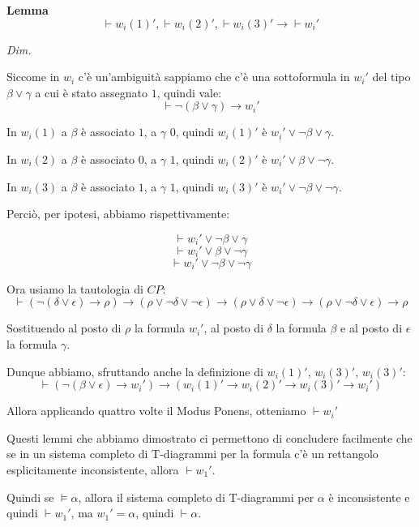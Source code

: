 \documentclass[a4paper, 12pt]{article}
\begin{document}
\begin{flushleft}
\textbf{Lemma}
$$\vdash w_i(1)', \vdash w_i(2)', \vdash w_i(3)' \rightarrow \vdash w_i'$$

\textit{Dim.}

Siccome in $w_i$ c'è un'ambiguità sappiamo che c'è una sottoformula in $w_i'$
del tipo $\beta \lor \gamma$ a cui è stato assegnato $1$, quindi vale:
$$\vdash \neg (\beta \lor \gamma) \rightarrow w_i'$$

In $w_i(1)$ a $\beta$ è associato $1$, a $\gamma$ $0$, quindi $w_i(1)'$ è $w_i' \lor \neg \beta \lor \gamma$.

In $w_i(2)$ a $\beta$ è associato $0$, a $\gamma$ $1$, quindi $w_i(2)'$ è $w_i' \lor \beta \lor \neg \gamma$.

In $w_i(3)$ a $\beta$ è associato $1$, a $\gamma$ $1$, quindi $w_i(3)'$ è $w_i' \lor \neg \beta \lor \neg \gamma$.

Perciò, per ipotesi, abbiamo rispettivamente:

$$\vdash w_i' \lor \neg \beta \lor \gamma$$
$$\vdash w_i' \lor \beta \lor \neg \gamma$$
$$\vdash w_i' \lor \neg \beta \lor \neg \gamma$$

Ora usiamo la tautologia di $CP$:
$$\vdash (\neg (\delta \lor \epsilon) \rightarrow \rho) \rightarrow
         (\rho \lor \neg \delta \lor \neg \epsilon) \rightarrow (\rho \lor \delta \lor \neg \epsilon)
           \rightarrow (\rho \lor \neg \delta \lor \epsilon) \rightarrow \rho$$

Sostituendo al posto di $\rho$ la formula $w_i'$, al posto di $\delta$ la formula $\beta$
e al posto di $\epsilon$ la formula $\gamma$.

Dunque abbiamo, sfruttando anche la definizione di $w_i(1)'$, $w_i(3)'$, $w_i(3)'$:
$$\vdash (\neg (\beta \lor \epsilon) \rightarrow w_i') \rightarrow
         (w_i(1)' \rightarrow w_i(2)' \rightarrow w_i(3)' \rightarrow w_i')$$

Allora applicando quattro volte il Modus Ponens, otteniamo $\vdash w_i'$
\end{flushleft}

Questi lemmi che abbiamo dimostrato ci permettono di concludere facilmente
che se in un sistema completo di T-diagrammi per la formula c'è un rettangolo esplicitamente inconsistente,
allora $\vdash w_1'$.

Quindi se $\vDash \alpha$, allora il sistema completo di T-diagrammi per $\alpha$ è inconsistente
e quindi $\vdash w_1'$, ma $w_1' = \alpha$, quindi $\vdash \alpha$.
\end{document}
